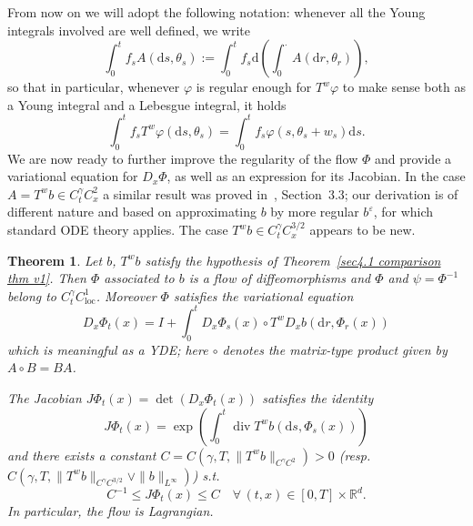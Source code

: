 \documentclass[10pt]{article}
\newcommand{\assign}{:=}
\newcommand{\comma}{{,}}
\newcommand{\mathd}{\mathrm{d}}
\newcommand{\tmop}[1]{\ensuremath{\operatorname{#1}}}
\newtheorem{theorem}{Theorem}
\begin{document}
From now on we will adopt the following notation: whenever all the Young
integrals involved are well defined, we write
\[ \int_0^t f_s A (\mathd s \comma \theta_s) \assign \int_0^t f_s \mathd
   \left( \int_0^{\cdot} A (\mathd r, \theta_r) \right), \]
so that in particular, whenever $\varphi$ is regular enough for $T^w \varphi$
to make sense both as a Young integral and a Lebesgue integral, it holds
\[ \int_0^t f_s T^w \varphi (\mathd s \comma \theta_s) = \int_0^t f_s \varphi
   (s, \theta_s + w_s) \mathd s. \]
We are now ready to further improve the regularity of the flow $\Phi$ and
provide a variational equation for $D_x \Phi$, as well as an expression for
its Jacobian. In the case $A = T^w b \in C^{\gamma}_t C^2_x$ a similar result
was proved in~{\cite{hu}}, Section~3.3; our derivation is of different nature
and based on approximating $b$ by more regular $b^{\varepsilon}$, for which
standard ODE theory applies. The case $T^w b \in C^{\gamma}_t C^{3 / 2}_x$
appears to be new.

\begin{theorem}
  \label{sec4.3 thm variational equation}Let $b$, $T^w b$ satisfy the
  hypothesis of Theorem~\ref{sec4.1 comparison thm v1}. Then $\Phi$ associated
  to $b$ is a flow of diffeomorphisms and $\Phi$ and $\psi = \Phi^{- 1}$
  belong to $C^{\gamma}_t C^1_{\tmop{loc}}$. Moreover $\Phi$ satisfies the
  variational equation
  \begin{equation}
    D_x \Phi_t (x) = I + \int_0^t D_x \Phi_s (x) \circ T^w D_x b (\mathd r,
    \Phi_r (x)) \label{sec4.3 variational equation}
  \end{equation}
  which is meaningful as a YDE; here $\circ$ denotes the matrix-type product
  given by $A \circ B = B A$.
  
  The Jacobian $J \Phi_t (x) = \det (D_x \Phi_t (x))$ satisfies the identity
  \begin{equation}
    J \Phi_t (x) = \exp \left( \int_0^t \tmop{div} T^w b (\mathd s, \Phi_s
    (x)) \right) \label{sec4.3 jacobian equation}
  \end{equation}
  and there exists a constant $C = C (\gamma, T, \| T^w b \|_{C^{\gamma} C^2})
  > 0$ (resp. $C (\gamma, T, \| T^w b \|_{C^{\gamma} C^{3 / 2}} \vee \| b
  \|_{L^{\infty}})$) s.t.
  \[ C^{- 1} \leqslant J \Phi_t (x) \leqslant C \quad \forall \, (t, x) \in
     [0, T] \times \mathbb{R}^d . \]
  In particular, the flow is Lagrangian.
\end{theorem}
\end{document}
